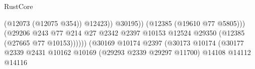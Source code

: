 \begin{lexlean}{RustCore}
\begin{coremodule}
                                                                                  (@12073
                                                                                    (@12075 @354))
                                                                                  @12423))
                                                                              @30195))
                                                                          (@12385
                                                                            (@19610 @77 @5805)))
                                                                        (@29206
                                                                          @243
                                                                          @77
                                                                          @214
                                                                          @27
                                                                          @2342
                                                                          @2397
                                                                          @10153
                                                                          @12524
                                                                          @29350
                                                                          (@12385
                                                                            (@27665 @77 @10153))))))
                                                                  (@30169
                                                                    @10174
                                                                    @2397
                                                                    (@30173
                                                                      @10174
                                                                      (@30177
                                                                        @2339
                                                                        @2431
                                                                        @10162
                                                                        @10169
                                                                        (@29293 @2339 @29297 @11700)
                                                                        @14108
                                                                        @14112
                                                                        @14116

\end{coremodule}
\end{lexlean}
